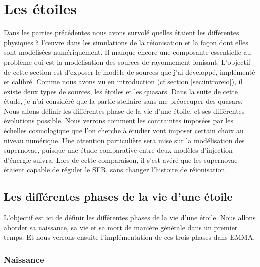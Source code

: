 \chapter{Les étoiles}
\label{sec:etoiles}

Dans les parties précédentes nous avons survolé quelles étaient les différentes physiques à l’œuvre dans les simulations de la réionisation et la façon dont elles sont modélisées numériquement.
Il manque encore une composante essentielle au problème qui est la modélisation des sources de rayonnement ionisant.
L'objectif de cette section est d'exposer le modèle de sources que j'ai développé, implémenté et calibré.
Comme nous avons vu en introduction (cf section \ref{sec:introreio}), il existe deux types de sources, les étoiles et les quasars.
Dans la suite de cette étude, je n'ai considéré que la partie stellaire sans me préoccuper des quasars.
Nous allons définir les différentes phase de la vie d'une étoile, et ses différentes évolutions possible.
Nous verrons comment les contraintes imposées par les échelles cosmologique que l'on cherche à étudier vont imposer certain choix au niveau numérique.
Une attention particulière sera mise sur la modélisation des supernovae, puisque une étude comparative entre deux modèles d'injection d'énergie suivra.
Lors de cette comparaison, il s'est avéré que les supernovae étaient capable de réguler le \ac{SFR}, sans changer l'histoire de réionisation.

\section{Les différentes phases de la vie d'une étoile}

L'objectif est ici de définir les différentes phases de la vie d'une étoile.
Nous allons aborder sa naissance, sa vie et sa mort de manière générale dans un premier temps.
Et nous verrons ensuite l'implémentation de ces trois phases dans EMMA.

\subsection{Naissance}


